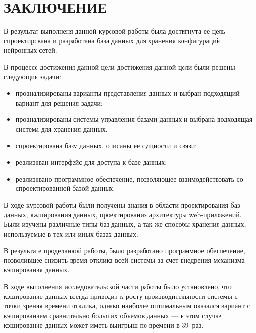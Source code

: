 \chapter*{ЗАКЛЮЧЕНИЕ}

В результат выполненя данной курсовой работы была достигнута ее цель --- спроектирована и разработана база данных для хранения конфигураций нейронных сетей.
    
В процессе достижения данной цели достижения данной цели были решены следующие задачи:

\begin{itemize}
    \item проанализированы варианты представления данных и выбран подходящий вариант для решения задачи;
    \item проанализированы системы управления базами данных и выбрана подходящая система для хранения данных.
    \item спроектирована базу данных, описаны ее сущности и связи;
    \item реализован интерфейс для доступа к базе данных;
    \item реализовано программное обеспечение, позволяющее взаимодействовать со спроектированной базой данных.
\end{itemize}

В ходе курсовой работы были получены знания в области проектирования баз данных, кжширования данных, проектирования архитектуры web-приложений. Были изучены различные типы баз данных, а так же способы хранения данных, используемые в тех или иных базах данных.

В результате проделанной работы, было разработано программное обеспечение, позволившее снизить время отклика всей системы за счет внедрения механизма кэширования данных.

В ходе выполнения исследовательской части работы было установлено, что кэширование данных всегда приводит к росту производительности системы с точки зрения времени отклика, однако наиболее оптимальным оказался вариант с кэшированием сравнительно больших объемов данных --- в этом случае кэширование данных может иметь выигрыш по времени в 39~раз.